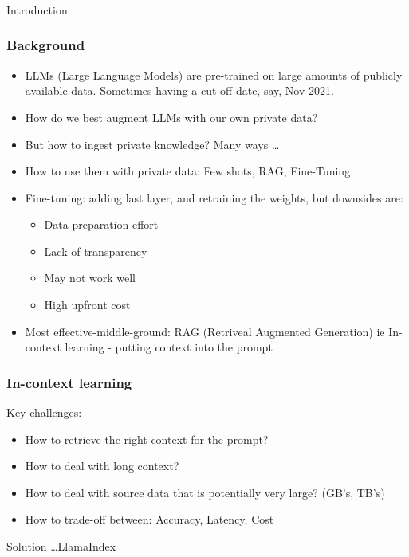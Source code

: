 \begin{frame}[fragile]\frametitle{}
\begin{center}
{\Large Introduction}
\end{center}
\end{frame}


\begin{frame}[fragile]\frametitle{Background}

\begin{itemize}
\item LLMs (Large Language Models) are pre-trained on large amounts of publicly available data. Sometimes having a cut-off date, say, Nov 2021.
\item How do we best augment LLMs with our own private data?
\item But how to ingest private knowledge? Many ways \ldots
\item How to use them with private data: Few shots, RAG, Fine-Tuning. 
\item Fine-tuning: adding last layer, and retraining the weights, but downsides are:
	\begin{itemize}
	\item Data preparation effort
	\item Lack of transparency
	\item May not work well
	\item High upfront cost
	\end{itemize}	
\item Most effective-middle-ground: RAG (Retriveal Augmented Generation) ie In-context learning - putting context into the prompt
\end{itemize}	


\end{frame}



\begin{frame}[fragile]\frametitle{In-context learning}

Key challenges:

\begin{itemize}
\item How to retrieve the right context for the prompt?
\item How to deal with long context? 
\item How to deal with source data that is potentially very large? (GB’s, TB’s) 
\item How to trade-off between: Accuracy, Latency, Cost
\end{itemize}	

Solution \ldots LlamaIndex

\end{frame}



